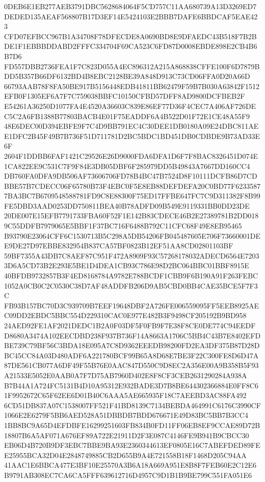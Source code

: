 \documentclass[UTF8,fontset=fandol,zihao=-4,a4paper]{ctexart}
\begin{document}
{{0DEB6E1EB277AEB3791DBC5628684064F5CD757C11AA680739A13D3269ED7DEDED135AEAF568807B17D3EF14E5424103E2BBB7DAFE6BBDCAF5EAE423
CFD07EFBCC967B1A34708F78DFECDE8A0690BD8E9DFAEDC43B518F7B2BDE1F1EBBBDDABD2FFFC334704F69CA523C6FD87D0008EBDE898E2CB4B6B7D6
FD557DBB2736FEA1F7C823D055A4EC896312A215A868838CFFE100F6D7879BDD5B357B66DF6132BD4B8EBC2128BE39A848D913C73CD06FFA0D20A66D
66793AAB78F8FA50BE917B5156448EDB41811BB62479F59B7B030A63842F1512EFB0F1305EF6A7F7C759038BBFC10150CFBD57DFF8AD9800DCFBEB2F
E54261A36250D1077FA4E4520A36603C839E86EF77D36F4CEC7A406AF726DEC5C2A6FB1388B77803BACB4E01F75EADDF6A4B522D01F72E1CE48A55F9
48E6DEC00D394EBFE9F7C4D9BB791EC4C30DEE1DB0180A09E24DBC811AEE1DFC2B45F49B7B736F51D711781D2BC5BDC1BD451DB0CDBDE9B73AD33E6F
2604F1DDBB6FAF1421C29526E26D9000FDA6DFA1D6F7F8BAC8326451D074E1CA822EE9C531C7F9F84E3DB05DBF6F285979DD5B49843A7667DD160CC4
DB760FA0DFA9DB506AF73606706FD78B4BC47B7524D8F10111DCFB86D7CDBBE57B7CDECC06F65780B73F4EBC0F5E8EB88DEFDEFA20C0BD77F6233587
7BA3BC7B6709548588781FD9C8E88300F75ED17FFBE647FC7C9D311382F8B99FE5DBD3AAD0253DD750811BEA40B78ADFD09B549E9119331BB0DD23DE
20DE007E15EFB7791733FBA60F52F1E142B83CDECE46B2E27389781B2DD0189C55DDFB7979065E5BBF1F37BC716F6488B792C11CFC68F49E8EB95465
B93790E23064CFF6C1530713B5C298A5DB54206FB045487605E706F73660001DEE9DE27D97EBBE832954B837CA57BF0823B12EF51AA8CD02801103BF
59BF7355A43DB7C8AEF87C951F472A8909F93C57268178032ADECD6564E72033D6A5CD73B2E293E5BE1D4DEA1CB93C786E98D2BC064BBC01BBF8915E
40BFDB9732857B3F4ED8168784A9782E788BCDF1CBB9F6B190A91F263FEBC1052A0CB0C2C0530C38D7AF48ADDFB206D9AB5CBD0BB4CAE35BCE5F7F3C
FB93B157BC70D3C939709B7EEF19648DBF2A726FE006559095FF5EEB8925AEC09DD2EBDC5BBC554D229310CAC0E977E482B3F9498CF205192B9BD958
24AED92FE1AF2021DEDC1B2A0F03DF5F0FB9F7E38F8CE0DE774C94EEDFD8680A3474A102EECDBD238F937B736F14A8663A1706C5BB4C43B7E8402EFD
BE739C79BF56C3BDA18E095A7C8D9362EEEDB98200FD2EA3DF375B87D28DBC45CC84A03D480ADF6A221780BCF99B65A8D68E7BE3F22C300FE8D6D47A
87DE561CB077A6DF49F55B76E0AAC847D550C9D8EC2A356E00A9B358B5F93A21533E5052E0AAB0A7F7D75AB7960D402E8F8CF3CEB2631290284A938A
B7B44A1A724FC5131B4D10A95312E932BADE3D7B8BE644302366884E0FF8C61F9952672C65F62EE6D01B40C6AAA5AE665935F18C7AEEBD3AC88FA492
6CD51DB837A07C1538007FF521F41BD8139C7134BEBDA464991C6176C3990CF1066E2E6279F5BB6AED528A51DBBDB7BDD676671E49D83BC5BB7B3CC4
1BB8BC9A65D4EFDBFE16299251603FB834B0FD11FF06EB8EF9CCAE89D72B18807B6A5AF071A676EF89A722E21911D2F3E087C4146FE9B941B9CBCC30
EB06D4B720B9DF3EBC7BBE9BA93E2360344613EF0805E16C7ABEFDED89FEE25955BCA32D04E2848749885CB2D655B9A4E721558B18F1468D205C94AA
41AAC1E6BBCA477E3BF10E25570A3B6A18A669A951E8B8F7FEB60E2C12E6B9791AB308EC7CA6CA5FFF639612716D4957C9D1B1B9BE799C551FA051E6
}}
\end{document}
